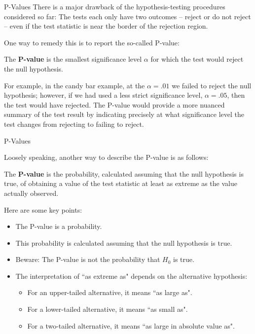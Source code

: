 \documentclass[handout]{beamer}
\renewcommand{\emph}{\textbf}
\begin{document}
\begin{frame}{P-Values}
There is a major drawback of the hypothesis-testing procedures considered so far:
The tests each only have two outcomes -- reject or do not reject -- even if the test statistic is near the border of the rejection region. 

\vspace{.2cm}
\pause One way to remedy this is to report the so-called P-value:

\begin{block}{}
The \emph{P-value} is the smallest significance level $\alpha$ for which the test would reject the null hypothesis.
\end{block}

\pause For example, in the candy bar example, at the $\alpha=.01$ we failed to reject the null hypothesis; however, if we had used a less strict significance level, $\alpha=.05$, then the test would have rejected. \pause The P-value would provide a more nuanced summary of the test result by indicating precisely at what significance level the test changes from rejecting to failing to reject.
\end{frame}

\begin{frame}{P-Values}

Loosely speaking, another way to describe the P-value is as follows:
\begin{block}{}
The \emph{P-value} is the probability, calculated assuming that the null hypothesis is
true, of obtaining a value of the test statistic at least as extreme as the value actually observed.
\end{block}
\pause
Here are some key points:
\begin{itemize}
\item The P-value is a probability.
\pause \item This probability is calculated assuming that the null hypothesis is true.
\pause \item Beware: The P-value is not the probability that $H_0$ is true.
\pause \item The interpretation of ``as extreme as" depends on the alternative hypothesis:
\begin{itemize}
\item For an upper-tailed alternative, it means ``as large as".
\item For a lower-tailed alternative, it means ``as small as".
\item For a two-tailed alternative, it means ``as large in absolute value as".
 \end{itemize}
\end{itemize}
\end{frame}
\end{document}
